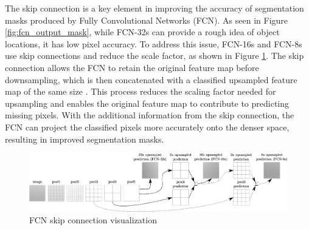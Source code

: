 \begin{figure}[!ht]
    \centering

\end{figure}

The skip connection is a key element in improving the accuracy of segmentation masks produced by Fully Convolutional Networks (FCN). As seen in Figure \ref{fig:fcn_output_mask}, while FCN-32s can provide a rough idea of object locations, it has low pixel accuracy. To address this issue, FCN-16s and FCN-8s use skip connections and reduce the scale factor, as shown in Figure \ref{fig:fcn_skip_conn}. The skip connection allows the FCN to retain the original feature map before downsampling, which is then concatenated with a classified upsampled feature map of the same size \cite{mask_rcnn_2017}. This process reduces the scaling factor needed for upsampling and enables the original feature map to contribute to predicting missing pixels. With the additional information from the skip connection, the FCN can project the classified pixels more accurately onto the denser space, resulting in improved segmentation masks.

\begin{figure}[!ht]
    \centering
    \includegraphics[width=6in]{figures/fcn_skip_conn.png}
    \caption{FCN skip connection visualization}  \label{fig:fcn_skip_conn}
\end{figure}